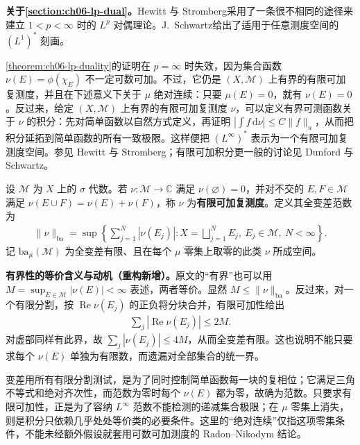 \documentclass[../../main.tex]{subfiles}
\begin{document}
\textbf{关于\cref{section:ch06-lp-dual}。}Hewitt 与 Stromberg\cite[第15节]{folland-bib-076}采用了一条很不相同的途径来建立 $1<p<\infty$ 时的 $L^p$ 对偶理论。J.~Schwartz\cite{folland-bib-130}给出了适用于任意测度空间的 $(L^1)^*$ 刻画。

\cref{theorem:ch06-lp-duality}的证明在 $p=\infty$ 时失效，因为集合函数 $\nu(E)=\phi(\chi_E)$ 不一定可数可加。不过，它仍是 $(X,\mathscr M)$ 上有界的有限可加复测度，并且在下述意义下关于 $\mu$ 绝对连续：只要 $\mu(E)=0$，就有 $\nu(E)=0$。反过来，给定 $(X,\mathscr M)$ 上有界的有限可加复测度 $\nu$，可以定义有界可测函数关于 $\nu$ 的积分：先对简单函数以自然方式定义，再证明 $|\int f\,\mathrm d\nu|\leqslant C\|f\|_u$，从而把积分延拓到简单函数的所有一致极限。这样便把 $(L^\infty)^*$ 表示为一个有限可加复测度空间。参见 Hewitt 与 Stromberg\cite[第20节]{folland-bib-076}；有限可加积分更一般的讨论见 Dunford 与 Schwartz\cite[第3章]{folland-bib-035}。
\begin{definition}\label{definition:ch06-ba-measures}
设 $\mathscr M$ 为 $X$ 上的 $\sigma$ 代数。若 $\nu:\mathscr M\to\mathbb C$ 满足 $\nu(\varnothing)=0$，并对不交的 $E,F\in\mathscr M$ 满足 $\nu(E\cup F)=\nu(E)+\nu(F)$，称 $\nu$ 为\textbf{有限可加复测度}。定义其全变差范数为
\begin{align*}
\|\nu\|_{\mathrm{ba}}
=\sup\left\{\sum_{j=1}^N|\nu(E_j)|:
X=\bigsqcup_{j=1}^NE_j,\ E_j\in\mathscr M,\ N<\infty\right\}.
\end{align*}
记 $\mathrm{ba}_\mu(\mathscr M)$ 为全变差有限、且在每个 $\mu$ 零集上取零的此类 $\nu$ 所成空间。
\end{definition}
\begin{remark}
\textbf{有界性的等价含义与动机（重构新增）。}原文的“有界”也可以用 $M=\sup_{E\in\mathscr M}|\nu(E)|<\infty$ 表述，两者等价。显然 $M\leqslant\|\nu\|_{\mathrm{ba}}$。反过来，对一个有限分割，按 $\operatorname{Re}\nu(E_j)$ 的正负将分块合并，有限可加性给出
\begin{align*}
\sum_j|\operatorname{Re}\nu(E_j)|\leqslant2M.
\end{align*}
对虚部同样有此界，故 $\sum_j|\nu(E_j)|\leqslant4M$，从而全变差有限。这也说明不能只要求每个 $\nu(E)$ 单独为有限数，而遗漏对全部集合的统一界。

变差用所有有限分割测试，是为了同时控制简单函数每一块的复相位；它满足三角不等式和绝对齐次性，而范数为零时每个 $\nu(E)$ 都为零，故确为范数。只要求有限可加性，正是为了容纳 $L^\infty$ 范数不能检测的递减集合极限；在 $\mu$ 零集上消失，则是积分只依赖几乎处处等价类的必要条件。这里的“绝对连续”仅指这项零集条件，不能未经额外假设就套用可数可加测度的 Radon–Nikodym 结论。
\end{remark}
\end{document}
